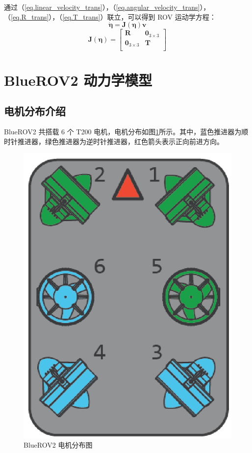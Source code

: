 通过（\ref{eq.linear_velocity_trans}），（\ref{eq.angular_velocity_trans}），（\ref{eq.R_trans}），（\ref{eq.T_trans}）联立，可以得到 ROV 运动学方程：
\begin{equation}
    \dot{\symbf{\eta}} = \symbf{J}(\symbf{\eta})\symbf{v}
    \label{eq.kinetics_equation}
\end{equation}
\begin{equation}
    \symbf{J}(\symbf{\eta}) = \begin{bmatrix}
        \symbf{R} & \symbf{0}_{3\times 3} \\
        \symbf{0}_{3\times 3} & \symbf{T} \\
    \end{bmatrix}
    \label{eq.T_trans_inv}
\end{equation}

\section{BlueROV2 动力学模型}

\subsection{电机分布介绍}

BlueROV2 共搭载 6 个 T200 电机，电机分布如图\ref{f.motor_distribution}所示。其中，蓝色推进器为顺时针推进器，绿色推进器为逆时针推进器，红色箭头表示正向前进方向。

\begin{figure}[hbt]
    \centering
    \includegraphics[width=0.2\linewidth]{images/chapter2/motor_distribution.png}
    \caption{BlueROV2 电机分布图}
    \label{f.motor_distribution}
\end{figure}

